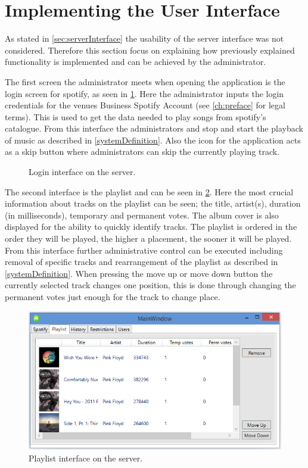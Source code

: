\section{Implementing the User Interface}\label{sec:impinterface}
As stated in \cref{sec:serverInterface} the usability of the server interface was not considered. Therefore this section focus on explaining how previously explained functionality is implemented and can be achieved by the administrator.

The first screen the administrator meets when opening the application is the login screen for spotify, as seen in \cref{fig:loginInterface}. Here the administrator inputs the login credentials for the venues Business Spotify Account (see \cref{ch:preface} for legal terms). This is used to get the data needed to play songs from spotify's catalogue. From this interface the administrators and stop and start the playback of music as described in \cref{systemDefinition}. Also the icon for the application acts as a skip button where administrators can skip the currently playing track.

\begin{figure}[H]\label{fig:loginInterface}
  \centering
  \caption{Login interface on the server.}
\end{figure}

The second interface is the playlist and can be seen in \cref{fig:ServerInterfacePlaylist}. Here the most crucial information about tracks on the playlist can be seen; the title, artist(s), duration (in milliseconds), temporary and permanent votes. The album cover is also displayed for the ability to quickly identify tracks. The playlist is ordered in the order they will be played, the higher a placement, the sooner it will be played. From this interface further administrative control can be executed including removal of specific tracks and rearrangement of the playlist as described in \cref{systemDefinition}. When pressing the move up or move down button the currently selected track changes one position, this is done through changing the permanent votes just enough for the track to change place.

\begin{figure}[hbtp]
  \centering
  \includegraphics[width=\textwidth]{Images/ServerInterfacePlaylist.png}
  \caption{Playlist interface on the server.}\label{fig:ServerInterfacePlaylist}
\end{figure}

